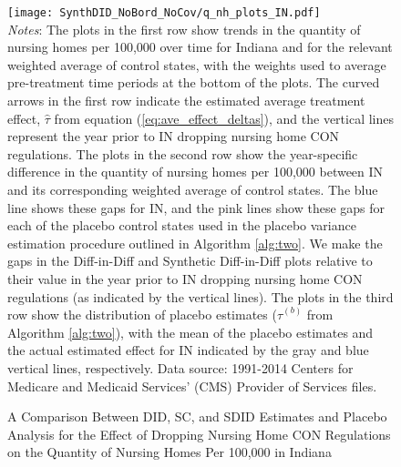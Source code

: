\documentclass[../Main.tex]{subfiles}
\begin{document}
\newpage
{}
\begin{figure}[t] 
    \setlength{}
	\caption{\label{fig:q_nh_plots_in} \centering A Comparison Between DID, SC, and SDID Estimates and Placebo Analysis for the Effect of Dropping Nursing Home CON Regulations on the Quantity of Nursing Homes Per 100,000 in Indiana} {\centering\texttt{[image: SynthDID\_NoBord\_NoCov/q\_nh\_plots\_IN.pdf]}}
    \vspace{-1.4cm}\\
    \scriptsize
		\textit{Notes}: The plots in the first row show trends in the quantity of nursing homes per 100,000 over time for Indiana and for the relevant weighted average of control states, with the weights used to average pre-treatment time periods at the bottom of the plots. The curved arrows in the first row indicate the estimated average treatment effect, $\hat{\tau}$ from equation (\ref{eq:ave_effect_deltas}), and the vertical lines represent the year prior to IN dropping nursing home CON regulations. The plots in the second row show the year-specific difference in the quantity of nursing homes per 100,000 between IN and its corresponding weighted average of control states. The blue line shows these gaps for IN, and the pink lines show these gaps for each of the placebo control states used in the placebo variance estimation procedure outlined in Algorithm \ref{alg:two}. We make the gaps in the Diff-in-Diff and Synthetic Diff-in-Diff plots relative to their value in the year prior to IN dropping nursing home CON regulations (as indicated by the vertical lines). The plots in the third row show the distribution of placebo estimates ($\hat{\tau}^{(b)}$ from Algorithm \ref{alg:two}), with the mean of the placebo estimates and the actual estimated effect for IN indicated by the gray and blue vertical lines, respectively. Data source: 1991-2014 Centers for Medicare and Medicaid Services’ (CMS) Provider of Services files.
\end{figure}
\restoregeometry
\clearpage
\end{document}
